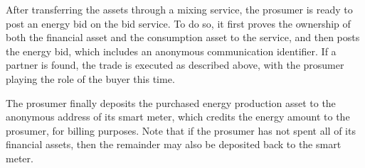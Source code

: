 After transferring the assets through a mixing service, the prosumer
is ready to post an energy bid on the bid service.  To do so, it first
proves the ownership of both the financial asset and the consumption
asset to the service, and then posts the energy bid, which includes an
anonymous communication identifier.  If a partner is found, the trade
is executed as described above, with the prosumer playing the role of
the buyer this time.  

The prosumer finally deposits the purchased energy production asset to
the anonymous address of its smart meter, which credits the energy
amount to the prosumer, for billing purposes.  Note that if the
prosumer has not spent all of its financial assets, then the remainder
may also be deposited back to the smart meter.





